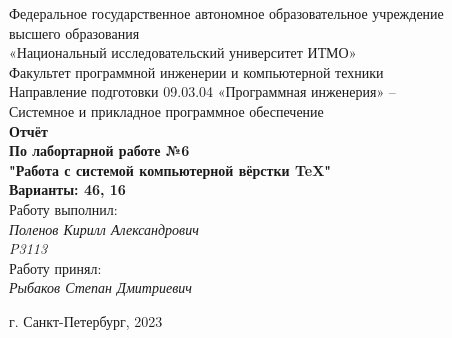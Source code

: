 \documentclass[main.tex]{subfiles}
\begin{document}
\pagestyle{empty}
\begin{center}

\large
Федеральное государственное автономное образовательное учреждение  \\
высшего образования \\
«Национальный исследовательский университет ИТМО» \\
Факультет программной инженерии и компьютерной техники \\
Направление подготовки 09.03.04 «Программная инженерия» – \\
Системное и прикладное программное обеспечение \\
\vspace{5cm}
\textbf{Отчёт} \\
\vspace{0mm}
\textbf{По лабортарной работе №6} \\
\textbf{"Работа с системой компьютерной вёрстки TeX"} \\
\textbf{Варианты: 46, 16} \\
\vspace{3cm}
\leftskip=9cm
Работу выполнил: \\
\textit{Поленов Кирилл Александрович \\ P3113 \\}
\vspace{1cm}
Работу принял: \\
\textit{Рыбаков Степан Дмитриевич} \\
\vfill
\begin{center}
г. Санкт-Петербург, 2023 \\
\end{center}
\end{center}
\end{document}

